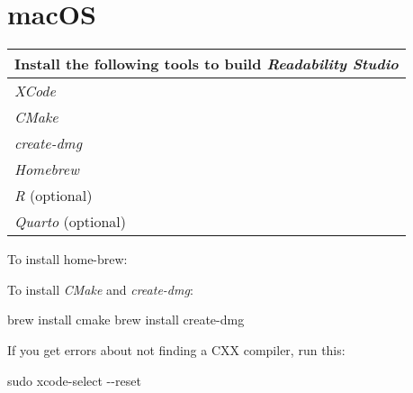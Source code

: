 \documentclass[
  letterpaper,
]{LegrandOrangeBook}
\newenvironment{Shaded}{\begin{snugshade}}{\end{snugshade}}
\newcommand{\AttributeTok}[1]{\textcolor[rgb]{0.40,0.45,0.13}{#1}}
\newcommand{\DataTypeTok}[1]{\textcolor[rgb]{0.68,0.00,0.00}{#1}}
\newcommand{\ExtensionTok}[1]{\textcolor[rgb]{0.00,0.23,0.31}{#1}}
\newcommand{\FunctionTok}[1]{\textcolor[rgb]{0.28,0.35,0.67}{#1}}
\newcommand{\NormalTok}[1]{\textcolor[rgb]{0.00,0.23,0.31}{#1}}
\newcommand{\StringTok}[1]{\textcolor[rgb]{0.13,0.47,0.30}{#1}}
\newcommand{\VariableTok}[1]{\textcolor[rgb]{0.07,0.07,0.07}{#1}}
\begin{document}
\chapter{\texorpdfstring{macOS \faApple }{macOS }}\label{macos-1}

\begin{longtable}[]{@{}
  >{\raggedright\arraybackslash}p{}@{}}
\toprule\noalign{}
\begin{minipage}[b]{\linewidth}\raggedright
Install the following tools to build \emph{Readability Studio}
\end{minipage} \\
\midrule\noalign{}
\endhead
\bottomrule\noalign{}
\endlastfoot
\emph{XCode} \\
\emph{CMake} \\
\emph{create-dmg} \\
\emph{Homebrew} \\
\emph{R} (optional) \\
\emph{Quarto} (optional) \\
\end{longtable}

To install home-brew:

\begin{Shaded}
\end{Shaded}

To install \emph{CMake} and \emph{create-dmg}:

\begin{Shaded}
\begin{Highlighting}[]
\ExtensionTok{brew}\NormalTok{ install cmake}
\ExtensionTok{brew}\NormalTok{ install create{-}dmg}
\end{Highlighting}
\end{Shaded}

If you get errors about not finding a CXX compiler, run this:

\begin{Shaded}
\begin{Highlighting}[]
\FunctionTok{sudo}\NormalTok{ xcode{-}select }\AttributeTok{{-}{-}reset}
\end{Highlighting}
\end{Shaded}
\end{document}
